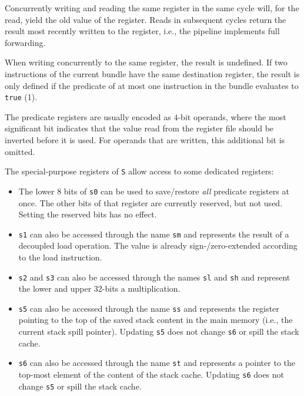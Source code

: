 \documentclass[a4paper,fontsize=10pt,twoside,DIV15,BCOR12mm,headinclude=true,footinclude=false,pagesize,bibtotoc]{scrbook}
\newcommand{\comment}[3]{

\textsf{\textbf{#1}} {\color{#3}#2}}
\newcommand{\wolf}[1]{\comment{Wolfgang}{#1}{OliveGreen}}
\renewcommand{\wolf}[1]{}
\begin{document}
Concurrently writing and reading the same register in the same cycle
will, for the read, yield the old value of the register. Reads in
subsequent cycles return the result most recently written to the
register, i.e., the pipeline implements full forwarding.

When writing concurrently to the same register, the result is
undefined. If two instructions of the current bundle have the same
destination register, the result is only defined if the predicate of
at most one instruction in the bundle evaluates to \texttt{true} (1).

\wolf{In practice, the result is even defined if both instructions
  write to the same register, but I would not make this a feature of
  the ISA.}

The predicate registers are usually encoded as $4$-bit operands, where the most
significant bit indicates that the value read from the register file should be
inverted before it is used. For operands that are written, this additional bit
is omitted.

The special-purpose registers of \texttt{S} allow access to some dedicated
registers:
\begin{itemize}
  \item The lower $8$ bits of \texttt{s0} can be used to save/restore
    \emph{all} predicate registers at once. The other bits of that
    register are currently reserved, but not used. Setting the reserved
	bits has no effect.
  \item \texttt{s1} can also be accessed through the name \texttt{sm} and
    represents the result of a decoupled load operation. The value is
    already sign-/zero-extended according to the load instruction.
  \item \texttt{s2} and \texttt{s3} can also be accessed through the names
    \texttt{sl} and \texttt{sh} and represent the lower and upper
    32-bits a multiplication.
  \item \texttt{s5} can also be accessed through the name \texttt{ss} and
    represents the register pointing to the top of the saved stack
	content in the main memory (i.e., the current stack spill pointer).
	Updating \texttt{s5} does not change \texttt{s6} or spill the stack cache.
  \item \texttt{s6} can also be accessed through the name \texttt{st} and
    represents a pointer to the top-most element of the content of the
    stack cache.
	Updating \texttt{s6} does not change \texttt{s5} or spill the stack cache.
\end{itemize}
\end{document}
